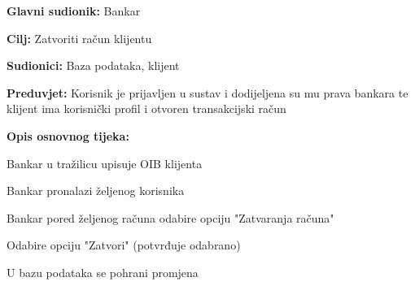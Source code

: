                 
                \noindent {}
                \begin{packed_item}
                
                  \item \textbf{Glavni sudionik: }Bankar
                  \item  \textbf{Cilj:} Zatvoriti račun klijentu
                  \item  \textbf{Sudionici:} Baza podataka, klijent
                  \item  \textbf{Preduvjet:} Korisnik je prijavljen u sustav i dodijeljena su mu prava bankara te klijent ima korisnički profil i otvoren transakcijski račun
                  \item  \textbf{Opis osnovnog tijeka:}
                  
                  \item[] \begin{packed_enum}
                
                	\item Bankar u tražilicu upisuje OIB klijenta
                	\item Bankar pronalazi željenog korisnika
                    \item Bankar pored željenog računa odabire opciju "Zatvaranja računa"
                    \item Odabire opciju "Zatvori" (potvrđuje odabrano)                  
                    \item U bazu podataka se pohrani promjena
                  \end{packed_enum}
                 
                \end{packed_item}
            

